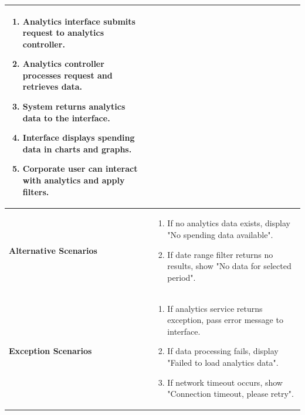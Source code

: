 \begin{longtable}{|p{}|p{}|}
\begin{enumerate}[nosep,leftmargin=*]
      \item Analytics interface submits request to analytics controller.
      \item Analytics controller processes request and retrieves data.
      \item System returns analytics data to the interface.
      \item Interface displays spending data in charts and graphs.
      \item Corporate user can interact with analytics and apply filters.
    \end{enumerate} \\ \hline
  \textbf{Alternative Scenarios} &
    \begin{enumerate}[nosep,leftmargin=*]
      \item If no analytics data exists, display "No spending data available".
      \item If date range filter returns no results, show "No data for selected period".
    \end{enumerate} \\ \hline
  \textbf{Exception Scenarios} &
    \begin{enumerate}[nosep,leftmargin=*]
      \item If analytics service returns exception, pass error message to interface.
      \item If data processing fails, display "Failed to load analytics data".
      \item If network timeout occurs, show "Connection timeout, please retry".
    \end{enumerate} \\ \hline

\end{longtable}

\vspace{5cm}

